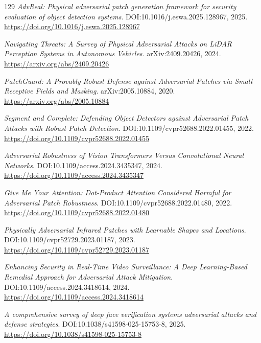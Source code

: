 \documentclass[11pt,a4paper]{article}
\begin{document}
\begin{thebibliography}{129}
\newblock \emph{AdvReal: Physical adversarial patch generation framework for security evaluation of object detection systems}.
\newblock DOI:10.1016/j.eswa.2025.128967, 2025.
\newblock \url{https://doi.org/10.1016/j.eswa.2025.128967}

\newblock \emph{Navigating Threats: A Survey of Physical Adversarial Attacks on LiDAR Perception Systems in Autonomous Vehicles}.
\newblock arXiv:2409.20426, 2024.
\newblock \url{https://arxiv.org/abs/2409.20426}

\newblock \emph{PatchGuard: A Provably Robust Defense against Adversarial Patches via Small Receptive Fields and Masking}.
\newblock arXiv:2005.10884, 2020.
\newblock \url{https://arxiv.org/abs/2005.10884}

\newblock \emph{Segment and Complete: Defending Object Detectors against Adversarial Patch Attacks with Robust Patch Detection}.
\newblock DOI:10.1109/cvpr52688.2022.01455, 2022.
\newblock \url{https://doi.org/10.1109/cvpr52688.2022.01455}

\newblock \emph{Adversarial Robustness of Vision Transformers Versus Convolutional Neural Networks}.
\newblock DOI:10.1109/access.2024.3435347, 2024.
\newblock \url{https://doi.org/10.1109/access.2024.3435347}

\newblock \emph{Give Me Your Attention: Dot-Product Attention Considered Harmful for Adversarial Patch Robustness}.
\newblock DOI:10.1109/cvpr52688.2022.01480, 2022.
\newblock \url{https://doi.org/10.1109/cvpr52688.2022.01480}

\newblock \emph{Physically Adversarial Infrared Patches with Learnable Shapes and Locations}.
\newblock DOI:10.1109/cvpr52729.2023.01187, 2023.
\newblock \url{https://doi.org/10.1109/cvpr52729.2023.01187}

\newblock \emph{Enhancing Security in Real-Time Video Surveillance: A Deep Learning-Based Remedial Approach for Adversarial Attack Mitigation}.
\newblock DOI:10.1109/access.2024.3418614, 2024.
\newblock \url{https://doi.org/10.1109/access.2024.3418614}

\newblock \emph{A comprehensive survey of deep face verification systems adversarial attacks and defense strategies}.
\newblock DOI:10.1038/s41598-025-15753-8, 2025.
\newblock \url{https://doi.org/10.1038/s41598-025-15753-8}


\end{thebibliography}
\end{document}
